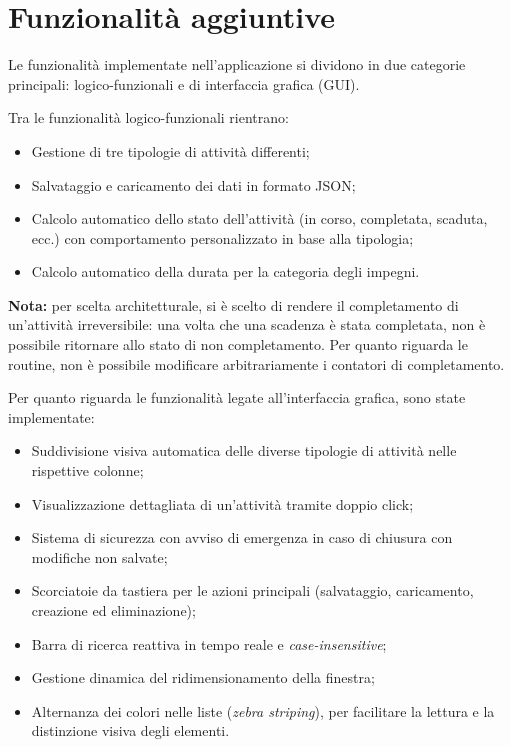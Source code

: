 \section{Funzionalità aggiuntive}

Le funzionalità implementate nell'applicazione si dividono in due categorie principali:
logico-funzionali e di interfaccia grafica (GUI).

Tra le funzionalità logico-funzionali rientrano:
\begin{itemize}
    \item Gestione di tre tipologie di attività differenti;
    \item Salvataggio e caricamento dei dati in formato JSON;
    \item Calcolo automatico dello stato dell'attività (in corso, completata, scaduta, ecc.) 
    con comportamento personalizzato in base alla tipologia;
    \item Calcolo automatico della durata per la categoria degli impegni.
\end{itemize}

\textbf{Nota:} per scelta architetturale, si è scelto di rendere il completamento di un'attività
irreversibile: una volta che una scadenza è stata completata, non è possibile ritornare allo stato di
non completamento. Per quanto riguarda le routine, non è possibile modificare arbitrariamente i
contatori di completamento.

Per quanto riguarda le funzionalità legate all'interfaccia grafica, sono state implementate:
\begin{itemize}
    \item Suddivisione visiva automatica delle diverse tipologie di attività nelle rispettive colonne;
    \item Visualizzazione dettagliata di un'attività tramite doppio click;
    \item Sistema di sicurezza con avviso di emergenza in caso di chiusura con modifiche non salvate;
    \item Scorciatoie da tastiera per le azioni principali (salvataggio, caricamento, creazione ed
    eliminazione);
    \item Barra di ricerca reattiva in tempo reale e \textit{case-insensitive};
    \item Gestione dinamica del ridimensionamento della finestra;
    \item Alternanza dei colori nelle liste (\textit{zebra striping}), per facilitare la
    lettura e la distinzione visiva degli elementi.
\end{itemize}